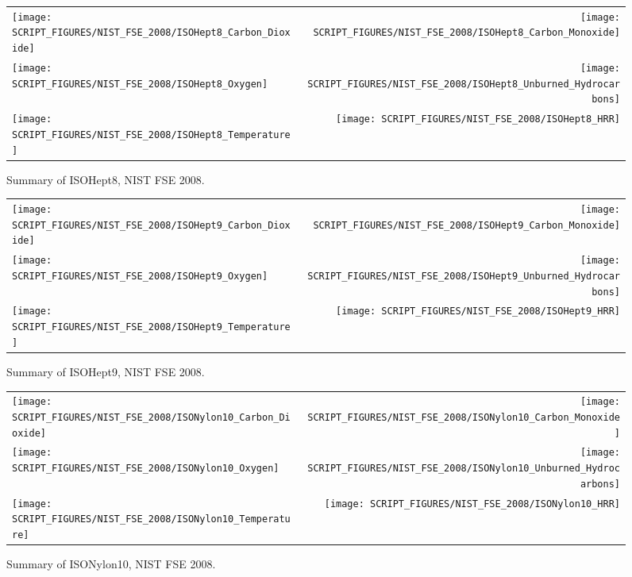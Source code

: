 \begin{figure}[p]
\begin{tabular*}{\textwidth}{l@{\extracolsep{\fill}}r}
\texttt{[image: SCRIPT\_FIGURES/NIST\_FSE\_2008/ISOHept8\_Carbon\_Dioxide]} &
\texttt{[image: SCRIPT\_FIGURES/NIST\_FSE\_2008/ISOHept8\_Carbon\_Monoxide]} \\
\texttt{[image: SCRIPT\_FIGURES/NIST\_FSE\_2008/ISOHept8\_Oxygen]} &
\texttt{[image: SCRIPT\_FIGURES/NIST\_FSE\_2008/ISOHept8\_Unburned\_Hydrocarbons]} \\
\texttt{[image: SCRIPT\_FIGURES/NIST\_FSE\_2008/ISOHept8\_Temperature]} &
\texttt{[image: SCRIPT\_FIGURES/NIST\_FSE\_2008/ISOHept8\_HRR]}
\end{tabular*}
\caption[Summary of ISOHept8, NIST FSE 2008]{Summary of ISOHept8, NIST FSE 2008.}
\label{NIST_FSE_1994_ISOHept8}
\end{figure}

\begin{figure}[p]
\begin{tabular*}{\textwidth}{l@{\extracolsep{\fill}}r}
\texttt{[image: SCRIPT\_FIGURES/NIST\_FSE\_2008/ISOHept9\_Carbon\_Dioxide]} &
\texttt{[image: SCRIPT\_FIGURES/NIST\_FSE\_2008/ISOHept9\_Carbon\_Monoxide]} \\
\texttt{[image: SCRIPT\_FIGURES/NIST\_FSE\_2008/ISOHept9\_Oxygen]} &
\texttt{[image: SCRIPT\_FIGURES/NIST\_FSE\_2008/ISOHept9\_Unburned\_Hydrocarbons]} \\
\texttt{[image: SCRIPT\_FIGURES/NIST\_FSE\_2008/ISOHept9\_Temperature]} &
\texttt{[image: SCRIPT\_FIGURES/NIST\_FSE\_2008/ISOHept9\_HRR]}
\end{tabular*}
\caption[Summary of ISOHept9, NIST FSE 2008]{Summary of ISOHept9, NIST FSE 2008.}
\label{NIST_FSE_1994_ISOHept9}
\end{figure}

\begin{figure}[p]
\begin{tabular*}{\textwidth}{l@{\extracolsep{\fill}}r}
\texttt{[image: SCRIPT\_FIGURES/NIST\_FSE\_2008/ISONylon10\_Carbon\_Dioxide]} &
\texttt{[image: SCRIPT\_FIGURES/NIST\_FSE\_2008/ISONylon10\_Carbon\_Monoxide]} \\
\texttt{[image: SCRIPT\_FIGURES/NIST\_FSE\_2008/ISONylon10\_Oxygen]} &
\texttt{[image: SCRIPT\_FIGURES/NIST\_FSE\_2008/ISONylon10\_Unburned\_Hydrocarbons]} \\
\texttt{[image: SCRIPT\_FIGURES/NIST\_FSE\_2008/ISONylon10\_Temperature]} &
\texttt{[image: SCRIPT\_FIGURES/NIST\_FSE\_2008/ISONylon10\_HRR]}
\end{tabular*}
\caption[Summary of ISONylon10, NIST FSE 2008]{Summary of ISONylon10, NIST FSE 2008.}
\label{NIST_FSE_1994_ISONylon10}
\end{figure}

